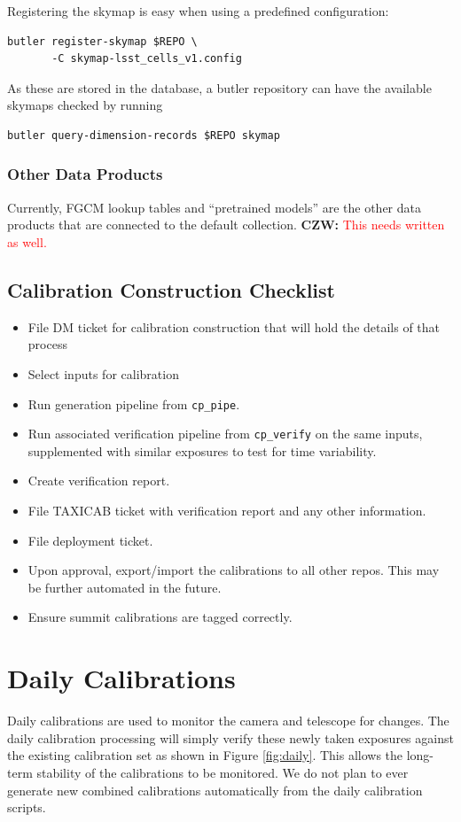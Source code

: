 \documentclass[DM,authoryear,toc]{lsstdoc}
\newcommand{\czw}[1]{
  \textbf{CZW: }\textcolor{red}{#1}
}
\begin{document}
Registering the skymap is easy when using a predefined configuration:
\begin{verbatim}
butler register-skymap $REPO \
       -C skymap-lsst_cells_v1.config
\end{verbatim}

As these are stored in the database, a butler repository can have the available skymaps checked by running
\begin{verbatim}
butler query-dimension-records $REPO skymap
\end{verbatim}

\subsubsection{Other Data Products}

Currently, FGCM lookup tables and ``pretrained models'' are the other data products that are connected to the default collection.  \czw{This needs written as well.}

\subsection{Calibration Construction Checklist}
\begin{itemize}
\item File DM ticket for calibration construction that will hold the details of that process
\item Select inputs for calibration
\item Run generation pipeline from \verb|cp_pipe|.
\item Run associated verification pipeline from \verb|cp_verify| on the same inputs, supplemented with similar exposures to test for time variability.
\item Create verification report.
\item File TAXICAB ticket with verification report and any other information.
\item File deployment ticket.
\item Upon approval, export/import the calibrations to all other repos.  This may be further automated in the future.
\item Ensure summit calibrations are tagged correctly.
\end{itemize}

\section{Daily Calibrations}
Daily calibrations are used to monitor the camera and telescope for changes.
The daily calibration processing will simply verify these newly taken exposures against the existing calibration set as shown in Figure \ref{fig:daily}.
This allows the long-term stability of the calibrations to be monitored.
We do not plan to ever generate new combined calibrations automatically from the daily calibration scripts.
\end{document}
